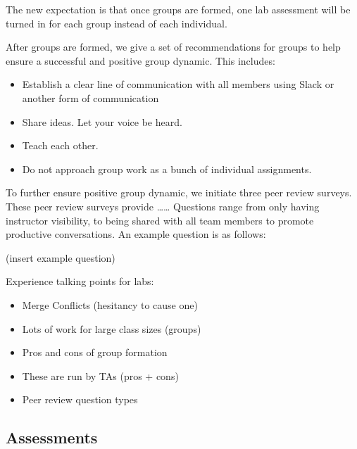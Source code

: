 \documentclass[
  12pt]{article}
\begin{document}
The new expectation is that once groups are formed, one lab assessment
will be turned in for each group instead of each individual.

After groups are formed, we give a set of recommendations for groups to
help ensure a successful and positive group dynamic. This includes:

\begin{itemize}
\item
  Establish a clear line of communication with all members using Slack
  or another form of communication
\item
  Share ideas. Let your voice be heard.
\item
  Teach each other.
\item
  Do not approach group work as a bunch of individual assignments.
\end{itemize}

To further ensure positive group dynamic, we initiate three peer review
surveys. These peer review surveys provide \ldots\ldots{} Questions
range from only having instructor visibility, to being shared with all
team members to promote productive conversations. An example question is
as follows:

(insert example question)

Experience talking points for labs:

\begin{itemize}
\item
  Merge Conflicts (hesitancy to cause one)
\item
  Lots of work for large class sizes (groups)
\item
  Pros and cons of group formation
\item
  These are run by TAs (pros + cons)
\item
  Peer review question types
\end{itemize}

\hypertarget{assessments}{%
\subsection{Assessments}\label{assessments}}


\renewcommand\refname{Discussion}
  
\end{document}
